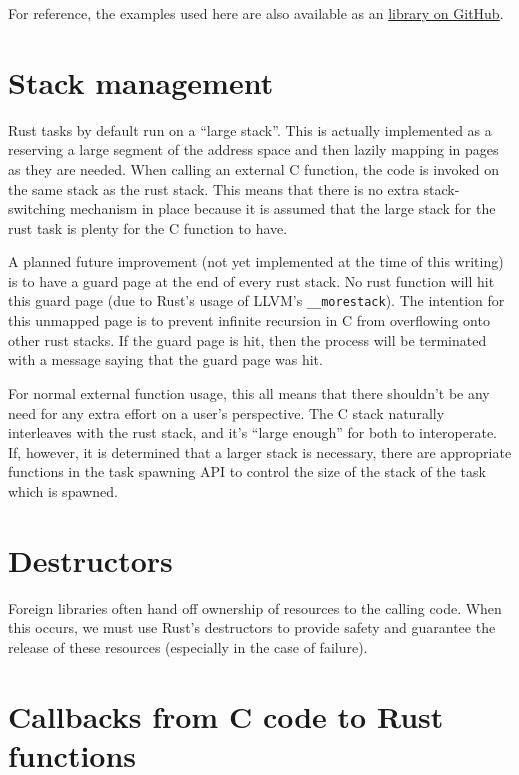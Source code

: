 \documentclass[]{article}
\begin{document}
For reference, the examples used here are also available as an
\href{https://github.com/thestinger/rust-snappy}{library on GitHub}.

\section{Stack management}\label{stack-management}

Rust tasks by default run on a ``large stack''. This is actually
implemented as a reserving a large segment of the address space and then
lazily mapping in pages as they are needed. When calling an external C
function, the code is invoked on the same stack as the rust stack. This
means that there is no extra stack-switching mechanism in place because
it is assumed that the large stack for the rust task is plenty for the C
function to have.

A planned future improvement (not yet implemented at the time of this
writing) is to have a guard page at the end of every rust stack. No rust
function will hit this guard page (due to Rust's usage of LLVM's
\texttt{\_\_morestack}). The intention for this unmapped page is to
prevent infinite recursion in C from overflowing onto other rust stacks.
If the guard page is hit, then the process will be terminated with a
message saying that the guard page was hit.

For normal external function usage, this all means that there shouldn't
be any need for any extra effort on a user's perspective. The C stack
naturally interleaves with the rust stack, and it's ``large enough'' for
both to interoperate. If, however, it is determined that a larger stack
is necessary, there are appropriate functions in the task spawning API
to control the size of the stack of the task which is spawned.

\section{Destructors}\label{destructors}

Foreign libraries often hand off ownership of resources to the calling
code. When this occurs, we must use Rust's destructors to provide safety
and guarantee the release of these resources (especially in the case of
failure).

\section{Callbacks from C code to Rust
functions}\label{callbacks-from-c-code-to-rust-functions}
\end{document}
